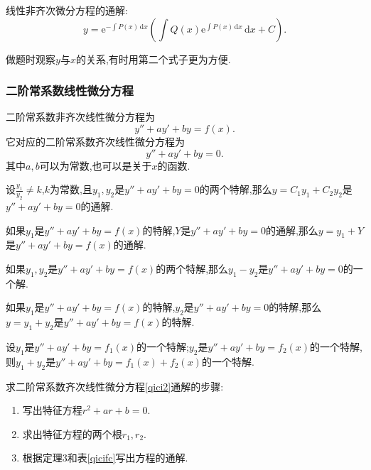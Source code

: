 线性非齐次微分方程的通解:
\begin{equation*}
    y=\mathrm{e}^{-\int P(x) \,\mathrm{d}x }\left( \int Q(x)\mathrm{e}^{\int P(x) \,\mathrm{d}x } \,\mathrm{d}x +C \right).
\end{equation*}

做题时观察$y$与$x$的关系,有时用第二个式子更为方便.

\subsubsection{二阶常系数线性微分方程}
二阶常系数非齐次线性微分方程为
\begin{equation}
    \label{fqici}
    y''+ay'+by=f(x).
\end{equation}
它对应的二阶常系数齐次线性微分方程为
\begin{equation}
    \label{qici2}
    y''+ay'+by=0.
\end{equation}
其中$a,b$可以为常数,也可以是关于$x$的函数.

\begin{ttheorem}[]
    设$\frac{y_1}{y_2} \neq k$,$k$为常数,且$y_1,y_2$是$y''+ay'+by=0$的两个特解,那么$y=C_1y_1+C_2y_2$是$y''+ay'+by=0$的通解.
\end{ttheorem}

\begin{theorem}[叠加原理]
    \begin{ttheorem}[]
        如果$y_1$是$y''+ay'+by=f(x)$的特解,$Y$是$y''+ay'+by=0$的通解,那么$y=y_1+Y$是$y''+ay'+by=f(x)$的通解.
    \end{ttheorem}
    \begin{ttheorem}[]
        如果$y_1,y_2$是$y''+ay'+by=f(x)$的两个特解,那么$y_1-y_2$是$y''+ay'+by=0$的一个解.
    \end{ttheorem}
    \begin{ttheorem}[]
        如果$y_1$是$y''+ay'+by=f(x)$的特解,$y_2$是$y''+ay'+by=0$的特解,那么$y=y_1+y_2$是$y''+ay'+by=f(x)$的特解.
    \end{ttheorem}

    \begin{ttheorem}[]
        设$y_1$是$y''+ay'+by=f_1(x)$的一个特解;$y_2$是$y''+ay'+by=f_2(x)$的一个特解,则$y_1+y_2$是$y''+ay'+by=f_1(x)+f_2(x)$的一个特解.
    \end{ttheorem}
\end{theorem}

求二阶常系数齐次线性微分方程\ref*{qici2}通解的步骤:
\begin{enumerate}
    \item 写出特征方程$r^2+ar+b=0$.
    \item 求出特征方程的两个根$r_1,r_2$.
    \item 根据定理3和表\ref*{qicifc}写出方程的通解.
\end{enumerate}


